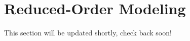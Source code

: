 \newpage
\section{Reduced-Order Modeling}\label{sec:roms}

This section will be updated shortly, check back soon!
